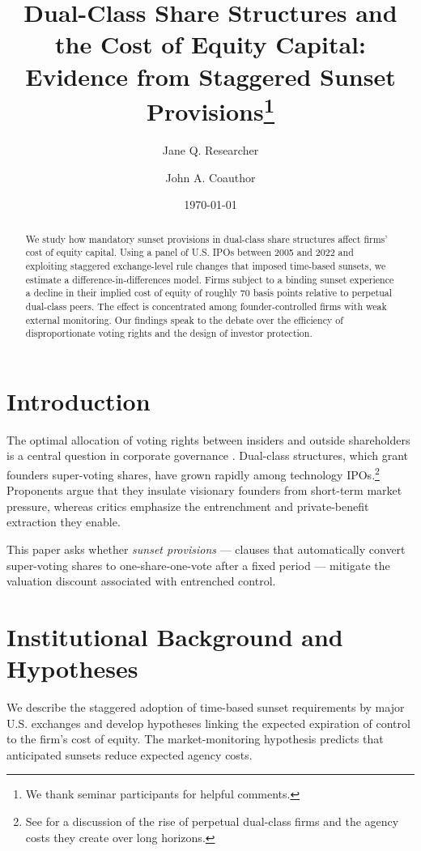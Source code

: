 \documentclass[12pt]{article}
\title{Dual-Class Share Structures and the Cost of Equity Capital:
Evidence from Staggered Sunset Provisions\thanks{We thank seminar participants
for helpful comments.}}
\author{Jane Q. Researcher \and John A. Coauthor}
\date{\today}
\begin{document}
\maketitle

\begin{abstract}
We study how mandatory sunset provisions in dual-class share structures affect
firms' cost of equity capital. Using a panel of U.S. IPOs between 2005 and 2022
and exploiting staggered exchange-level rule changes that imposed time-based
sunsets, we estimate a difference-in-differences model. Firms subject to a
binding sunset experience a decline in their implied cost of equity of roughly
70 basis points relative to perpetual dual-class peers. The effect is
concentrated among founder-controlled firms with weak external monitoring.
Our findings speak to the debate over the efficiency of disproportionate
voting rights and the design of investor protection.
\end{abstract}

\section{Introduction}
The optimal allocation of voting rights between insiders and outside
shareholders is a central question in corporate governance \citep{grossman1988}.
Dual-class structures, which grant founders super-voting shares, have grown
rapidly among technology IPOs.\footnote{See \citet{bebchuk2017} for a discussion
of the rise of perpetual dual-class firms and the agency costs they create over
long horizons.} Proponents argue that they insulate visionary founders from
short-term market pressure, whereas critics emphasize the entrenchment and
private-benefit extraction they enable.

This paper asks whether \emph{sunset provisions} — clauses that automatically
convert super-voting shares to one-share-one-vote after a fixed period —
mitigate the valuation discount associated with entrenched control.

\section{Institutional Background and Hypotheses}
We describe the staggered adoption of time-based sunset requirements by major
U.S. exchanges and develop hypotheses linking the expected expiration of
control to the firm's cost of equity. The market-monitoring hypothesis predicts
that anticipated sunsets reduce expected agency costs.
\end{document}
